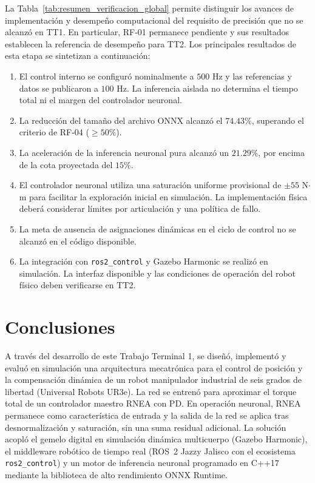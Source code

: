 \documentclass[12pt]{article}
\begin{document}
La Tabla~\ref{tab:resumen_verificacion_global} permite distinguir los avances de implementación y desempeño computacional del requisito de precisión que no se alcanzó en TT1. En particular, RF-01 permanece pendiente y sus resultados establecen la referencia de desempeño para TT2. Los principales resultados de esta etapa se sintetizan a continuación:
\begin{enumerate}
    \item El control interno se configuró nominalmente a $500$ Hz y las referencias y datos se publicaron a $100$ Hz. La inferencia aislada no determina el tiempo total ni el margen del controlador neuronal.
    \item La reducción del tamaño del archivo ONNX alcanzó el $74.43\%$, superando el criterio de RF-04 ($\ge50\%$).
    \item La aceleración de la inferencia neuronal pura alcanzó un $21.29\%$, por encima de la cota proyectada del $15\%$.
    \item El controlador neuronal utiliza una saturación uniforme provisional de $\pm55$ N$\cdot$m para facilitar la exploración inicial en simulación. La implementación física deberá considerar límites por articulación y una política de fallo.
    \item La meta de ausencia de asignaciones dinámicas en el ciclo de control no se alcanzó en el código disponible.
    \item La integración con \texttt{ros2\_control} y Gazebo Harmonic se realizó en simulación. La interfaz disponible y las condiciones de operación del robot físico deben verificarse en TT2.
\end{enumerate}


\newpage
{}
\section*{Conclusiones}

A través del desarrollo de este Trabajo Terminal 1, se diseñó, implementó y evaluó en simulación una arquitectura mecatrónica para el control de posición y la compensación dinámica de un robot manipulador industrial de seis grados de libertad (Universal Robots UR3e). La red se entrenó para aproximar el torque total de un controlador maestro RNEA con PD. En operación neuronal, RNEA permanece como característica de entrada y la salida de la red se aplica tras desnormalización y saturación, sin una suma residual adicional. La solución acopló el gemelo digital en simulación dinámica multicuerpo (Gazebo Harmonic), el middleware robótico de tiempo real (ROS~2 Jazzy Jalisco con el ecosistema \texttt{ros2\_control}) y un motor de inferencia neuronal programado en C++17 mediante la biblioteca de alto rendimiento ONNX Runtime.
\end{document}
